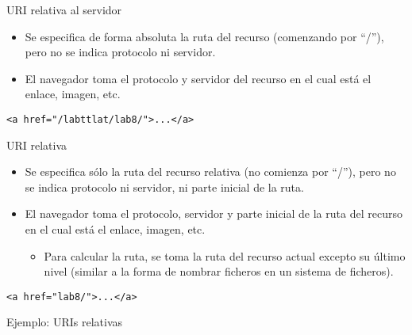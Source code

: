 \begin{slide}{URI relativa al servidor}
  \begin{itemize}
  \item Se especifica de forma absoluta la ruta del recurso
    (comenzando por ``/''), pero no
    se indica protocolo ni servidor.
  \item El navegador toma el protocolo y servidor del recurso
    en el cual está el enlace, imagen, etc.
\end{itemize}

\begin{Verbatim}[fontfamily=tt,fontsize=\fontsize{8}{8}]
<a href="/labttlat/lab8/">...</a>
\end{Verbatim}

\end{slide}

\begin{slide}{URI relativa}
  \begin{itemize}
  \item Se especifica sólo la ruta del recurso relativa (no comienza
    por ``/''), pero no
    se indica protocolo ni servidor, ni parte inicial de la ruta.
  \item El navegador toma el protocolo, servidor y parte inicial de la
    ruta del recurso
    en el cual está el enlace, imagen, etc.
    \begin{itemize}
    \item Para calcular la ruta, se toma la ruta del recurso actual
      excepto su último nivel (similar a la forma de nombrar ficheros
      en un sistema de ficheros).
    \end{itemize}
  \end{itemize}

\begin{Verbatim}[fontfamily=tt,fontsize=\fontsize{8}{8}]
<a href="lab8/">...</a>
\end{Verbatim}



\end{slide}

\begin{slide}{Ejemplo: URIs relativas}

\begin{center}
\end{center}

\end{slide}

